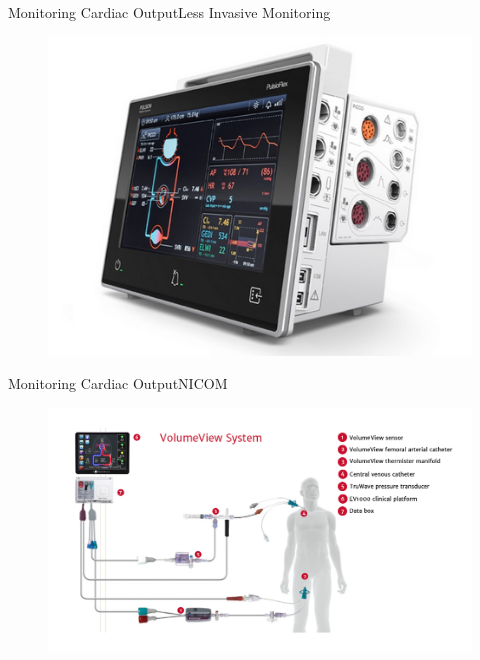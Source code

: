 \documentclass{beamer}
\begin{document}
	\begin{frame}{Monitoring Cardiac Output}{Less Invasive Monitoring}
		\begin{figure}
			\centering
			\includegraphics[height=0.8\textheight]{figures/nicom-picco}
			\label{fig:nicom-picco}
		\end{figure}
	\end{frame}
	\begin{frame}{Monitoring Cardiac Output}{NICOM}
		\begin{figure}
			\centering
			\includegraphics[width=1.0\textwidth]{figures/nicom-ev1000}
			\label{fig:nicom-evo1000}
		\end{figure}
	\end{frame}
\end{document}
